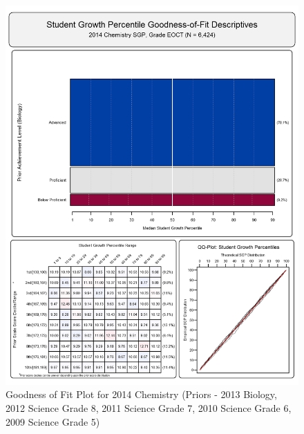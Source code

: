 \documentclass[12pt]{article}
\begin{document}
\begin{figure}[htbp]
\centering
\includegraphics{../img/Goodness_of_Fit/CHEMISTRY.2014/2014_CHEMISTRY_EOCT;2013_BIOLOGY_EOCT;2012_SCIENCE_8;2011_SCIENCE_7;2010_SCIENCE_6;2009_SCIENCE_5.png}
\caption{Goodness of Fit Plot for 2014 Chemistry (Priors - 2013 Biology,
2012 Science Grade 8, 2011 Science Grade 7, 2010 Science Grade 6, 2009
Science Grade 5)}
\end{figure}
\end{document}
